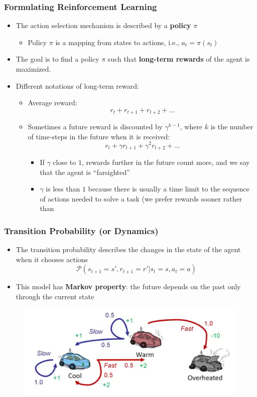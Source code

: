 \documentclass[handout]{beamer}
\newcommand{\PKernel}{\mathcal{P}}
\renewcommand{\high}{\textbf}
\begin{document}
\begin{frame}\frametitle{Formulating Reinforcement Learning}\small


\begin{itemize}
\item The action selection mechanism is described by a \high{policy} $\pi$
\begin{itemize}
\item Policy $\pi$ is a mapping from states to actions, i.e., $a_t = \pi(s_t)$
\end{itemize}
\item The goal is to find a policy $\pi$ such that \high{long-term rewards} of the agent is maximized. 
\item Different notations of long-term reward:
	\begin{itemize}
	\item
	Average reward:
	\[
	r_{t}+r_{t+1}+r_{t+2}+\dots
	\]
	\item Sometimes a future reward is discounted by $\gamma^{k-1}$, where $k$ is the number of time-steps in the future when it is received:
		\[
	r_{t}+\gamma r_{t+1}+\gamma^2 r_{t+2}+\dots
	\]
		\begin{itemize}
			\item If $\gamma$ close to $1$, rewards further in the future count more, and we say that the agent is ``farsighted''
			\item $\gamma$ is less than $1$ because there is usually a time limit to the sequence of actions needed to solve a task (we prefer rewards sooner rather than 
		\end{itemize}
	\end{itemize}
\end{itemize}
\end{frame}


\begin{frame}\frametitle{Transition Probability (or Dynamics)}\small
\begin{itemize}
\item The transition probability describes the changes in the state of the agent when it chooses actions
\[
	\PKernel(s_{t+1}=s', r_{t+1}=r' | s_t = s, a_t = a)
\]
%
\item This model has \high{Markov property}: the future depends on the past only through the current state
%
\end{itemize}
\begin{figure}
\includegraphics[width=0.7\linewidth]{Figures/rll6} 
\end{figure}
\end{frame}
\end{document}
